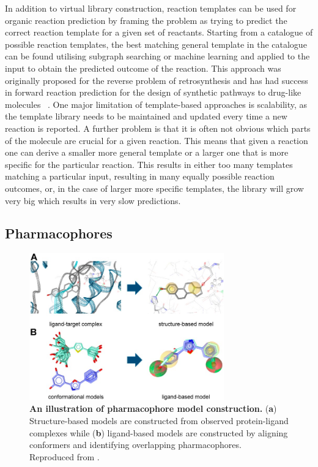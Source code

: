 In addition to virtual library construction, reaction templates can be used for organic reaction prediction by framing the problem as trying to predict the correct reaction template for a given set of reactants. Starting from a catalogue of possible reaction templates, the best matching general template in the catalogue can be found utilising subgraph searching or machine learning and applied to the input to obtain the predicted outcome of the reaction. This approach was originally proposed for the reverse problem of retrosynthesis \cite{Corey1985ComputerAssistedSynthesis} and has had success in forward reaction prediction for the design of synthetic pathways to drug-like molecules ~\cite{Klucznik2018EfficientLaboratory}. One major limitation of template-based approaches is scalability, as the template library needs to be maintained and updated every time a new reaction is reported. A further problem is that it is often not obvious which parts of the molecule are crucial for a given reaction. This means that given a reaction one can derive a smaller more general template or a larger one that is more specific for the particular reaction. This results in either too many templates matching a particular input, resulting in many equally possible reaction outcomes, or, in the case of larger more specific templates, the library will grow very big which results in very slow predictions.

\subsection{Pharmacophores} \label{subsec:pharmacophores}

\begin{figure}[t!] 
 \centering 
 \includegraphics[width=0.75\textwidth]{Chapters/Background/Figs/pharmacophore_models.png}
 \caption{\textbf{An illustration of pharmacophore model construction.} (\textbf{a}) Structure-based models are constructed from observed protein-ligand complexes while (\textbf{b}) ligand-based models are constructed by aligning conformers and identifying overlapping pharmacophores. Reproduced from \cite{Kaserer2015PharmacophoreReview}.}
 \label{fig:pharmacophore_models}
\end{figure}

